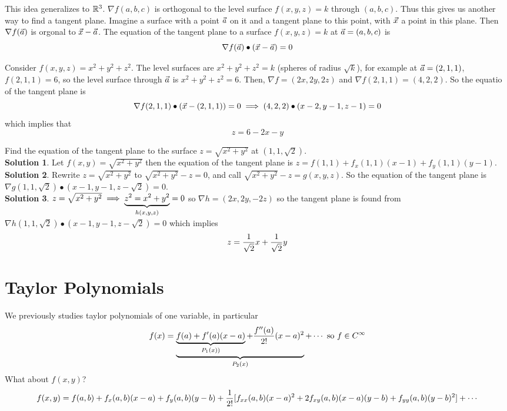 \documentclass[english, 11pt]{article}
\begin{document}
This idea generalizes to ${\mathbb{R}}^3$. $\nabla f(a,b,c)$ is orthogonal to the level surface $f(x,y,z) = k$ through $(a,b,c)$. Thus this gives us another way to find a tangent plane. Imagine a surface with a point $\vec{a}$ on it and a tangent plane to this point, with $\vec{x}$ a point in this plane. Then $\nabla f(\vec{a})$ is orgonal to $\vec{x} - \vec{a}$. The equation of the tangent plane to a surface $f(x,y,z) = k$ at $\vec{a} = (a,b,c)$ is
\[ \nabla f(\vec{a}) \bullet (\vec{x} - \vec{a}) = 0 \]

\begin{exmp}
  Consider $f(x,y,z) = x^2 + y^2 + z^2$. The level surfaces are $x^2 + y^2 + z^2 = k$ (spheres of radius $\sqrt{k}$), for example at $\vec{a} = (2,1,1)$, $f(2,1,1) = 6$, so the level surface through $\vec{a}$ is $x^2 + y^2 + z^2 = 6$. Then, $\nabla f = (2x,2y,2z)$ and $\nabla f (2,1,1)  = (4,2,2)$. So the equatio of the tangent plane is
  \[ \nabla f(2,1,1) \bullet (\vec{x} - (2,1,1)) = 0 \implies (4,2,2) \bullet (x-2, y-1, z-1) = 0 \]
  which implies that
  \[ z = 6 - 2x - y \]
\end{exmp}

\begin{exmp}
  Find the equation of the tangent plane to the surface $z = \sqrt{x^2 + y^2}$ at $(1,1,\sqrt{2})$. \\

  \textbf{Solution 1}. Let $f(x,y) = \sqrt{x^2 + y^2}$ then the equation of the tangent plane is $z = f(1,1) + f_x(1,1)(x-1) + f_y(1,1)(y-1)$. \\

  \textbf{Solution 2}. Rewrite $z = \sqrt{x^2 + y^2}$ to $\sqrt{x^2 + y^2} - z = 0$, and call $\sqrt{x^2 + y^2} - z = g(x,y,z)$. So the equation of the tangent plane is $\nabla g(1,1,\sqrt{2}) \bullet (x-1,y-1,z-\sqrt{2}) = 0$. \\

  \textbf{Solution 3}. $z = \sqrt{x^2 + y^2} \implies \underbrace{z^2 = x^2 + y^2}_{h(x,y,z)} = 0$ so $\nabla h = (2x, 2y, -2z)$ so the tangent plane is found from $\nabla h (1,1,\sqrt{2}) \bullet (x-1,y-1,z-\sqrt{2}) = 0$ which implies
  \[ z = \frac{1}{\sqrt{2}}x + \frac{1}{\sqrt{2}} y \]
\end{exmp}

\section{Taylor Polynomials}

We previously studies taylor polynomials of one variable, in particular
\[ f(x) = \ub{\ub{f(a) + f'(a)(x-a)}_{P_1(x))} + \f{f''(a)}{2!}(x-a)^2}_{P_2(x)} + \cdots \mbox{\ so\ } f \in C^{\infty} \]
What about $f(x,y)$?
\[ f(x,y) = f(a,b) + f_x(a,b)(x-a) + f_y(a,b)(y-b) + \frac{1}{2!} [f_{xx}(a,b)(x-a)^2 + 2f_{xy}(a,b)(x-a)(y-b) + f_{yy}(a,b)(y-b)^2] + \cdots\]
\end{document}
